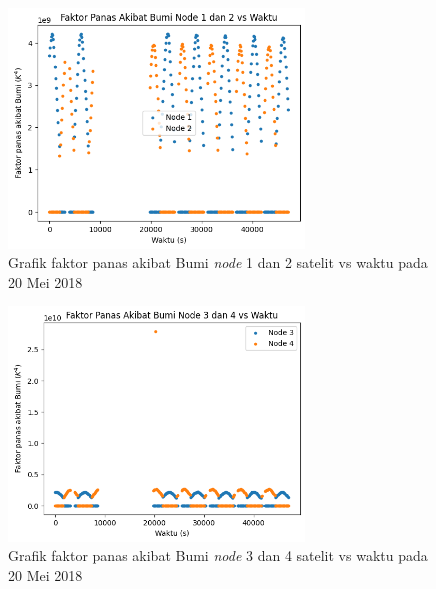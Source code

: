 \begin{figure}[H]
\setlength{}
\begin{center}
\includegraphics[width=0.7\textwidth]{fig/earth_node12_2018-05-20.png}
	\caption{Grafik faktor panas akibat Bumi \textit{node} 1 dan 2 satelit vs waktu pada 20 Mei 2018}
\label{fig:earth1220}
\end{center}
\end{figure}

\begin{figure}[H]
\setlength{}
\begin{center}
\includegraphics[width=0.7\textwidth]{fig/earth_node34_2018-05-20.png}
	\caption{Grafik faktor panas akibat Bumi \textit{node} 3 dan 4 satelit vs waktu pada 20 Mei 2018}
\label{fig:earth3420}
\end{center}
\end{figure}

